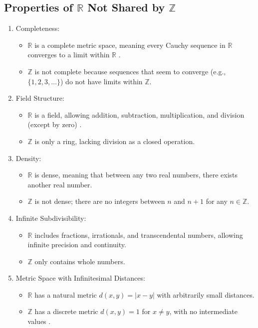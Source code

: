 \subsection{Properties of \( \mathbb{R} \) Not Shared by \( \mathbb{Z} \)}
\begin{enumerate}[topsep=0pt]
    \item Completeness:
    \begin{itemize}
        \item \( \mathbb{R} \) is a complete metric space, meaning every Cauchy sequence in \( \mathbb{R} \) converges to a limit within \( \mathbb{R} \) \cite{rudin1976}.
        \item \( \mathbb{Z} \) is not complete because sequences that seem to converge (e.g., \( \{1, 2, 3, \dots\} \)) do not have limits within \( \mathbb{Z} \).
    \end{itemize}

    \item Field Structure:
    \begin{itemize}
        \item \( \mathbb{R} \) is a field, allowing addition, subtraction, multiplication, and division (except by zero) \cite{Sutherland02}.
        \item \( \mathbb{Z} \) is only a ring, lacking division as a closed operation.
    \end{itemize}

    \item Density:
    \begin{itemize}
        \item \( \mathbb{R} \) is dense, meaning that between any two real numbers, there exists another real number.
        \item \( \mathbb{Z} \) is not dense; there are no integers between \( n \) and \( n+1 \) for any \( n \in \mathbb{Z} \).
    \end{itemize}

    \item Infinite Subdivisibility:
    \begin{itemize}
        \item \( \mathbb{R} \) includes fractions, irrationals, and transcendental numbers, allowing infinite precision and continuity.
        \item \( \mathbb{Z} \) only contains whole numbers.
    \end{itemize}

    \item Metric Space with Infinitesimal Distances:
    \begin{itemize}
        \item \( \mathbb{R} \) has a natural metric \( d(x, y) = |x - y| \) with arbitrarily small distances.
        \item \( \mathbb{Z} \) has a discrete metric \( d(x, y) = 1 \) for \( x \neq y \), with no intermediate values \cite{munkres2000}.
    \end{itemize}
\end{enumerate}


